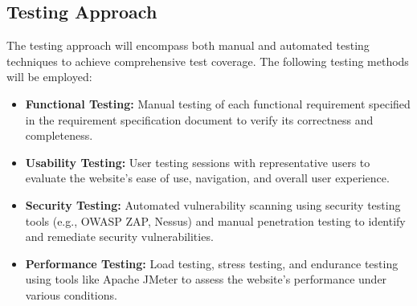 \documentclass{article}
\begin{document}
\subsection{Testing Approach}
The testing approach will encompass both manual and automated testing techniques to achieve comprehensive test coverage. The following testing methods will be employed:
\begin{itemize}
    \item \textbf{Functional Testing:} Manual testing of each functional requirement specified in the requirement specification document to verify its correctness and completeness.
    \item \textbf{Usability Testing:} User testing sessions with representative users to evaluate the website's ease of use, navigation, and overall user experience.
    \item \textbf{Security Testing:} Automated vulnerability scanning using security testing tools (e.g., OWASP ZAP, Nessus) and manual penetration testing to identify and remediate security vulnerabilities.
    \item \textbf{Performance Testing:} Load testing, stress testing, and endurance testing using tools like Apache JMeter to assess the website's performance under various conditions.
\end{itemize}
\clearpage
\end{document}
